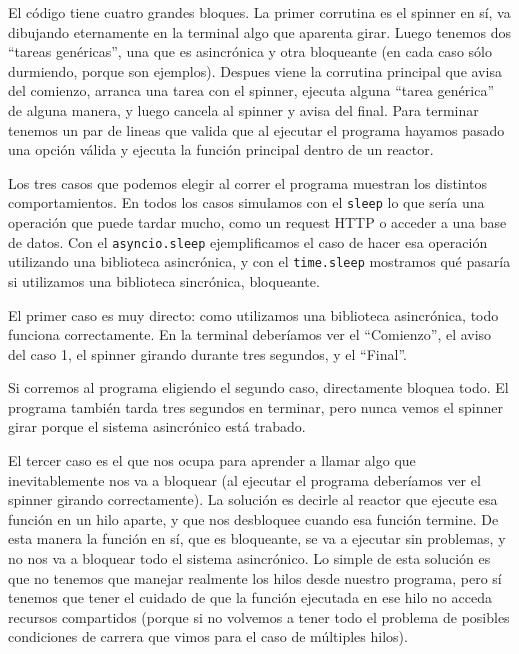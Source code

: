 
El código tiene cuatro grandes bloques. La primer corrutina es el spinner en sí, va dibujando eternamente en la terminal algo que aparenta girar. Luego tenemos dos ``tareas genéricas'', una que es asincrónica y otra bloqueante (en cada caso sólo durmiendo, porque son ejemplos). Despues viene la corrutina principal que avisa del comienzo, arranca una tarea con el spinner, ejecuta alguna ``tarea genérica'' de alguna manera, y luego cancela al spinner y avisa del final. Para terminar tenemos un par de lineas que valida que al ejecutar el programa hayamos pasado una opción válida y ejecuta la función principal dentro de un reactor.

Los tres casos que podemos elegir al correr el programa muestran los distintos comportamientos. En todos los casos simulamos con el \texttt{sleep} lo que sería una operación que puede tardar mucho, como un request HTTP o acceder a una base de datos. Con el \texttt{asyncio.sleep} ejemplificamos el caso de hacer esa operación utilizando una biblioteca asincrónica, y con el \texttt{time.sleep} mostramos qué pasaría si utilizamos una biblioteca sincrónica, bloqueante.

El primer caso es muy directo: como utilizamos una biblioteca asincrónica, todo funciona correctamente. En la terminal deberíamos ver el ``Comienzo'', el aviso del caso 1, el spinner girando durante tres segundos, y el ``Final''.

Si corremos al programa eligiendo el segundo caso, directamente bloquea todo. El programa también tarda tres segundos en terminar, pero nunca vemos el spinner girar porque el sistema asincrónico está trabado.

El tercer caso es el que nos ocupa para aprender a llamar algo que inevitablemente nos va a bloquear (al ejecutar el programa deberíamos ver el spinner girando correctamente). La solución es decirle al reactor que ejecute esa función en un hilo aparte, y que nos desbloquee cuando esa función termine. De esta manera la función en sí, que es bloqueante, se va a ejecutar sin problemas, y no nos va a bloquear todo el sistema asincrónico. Lo simple de esta solución es que no tenemos que manejar realmente los hilos desde nuestro programa, pero sí tenemos que tener el cuidado de que la función ejecutada en ese hilo no acceda recursos compartidos (porque si no volvemos a tener todo el problema de posibles condiciones de carrera que vimos para el caso de múltiples hilos).

